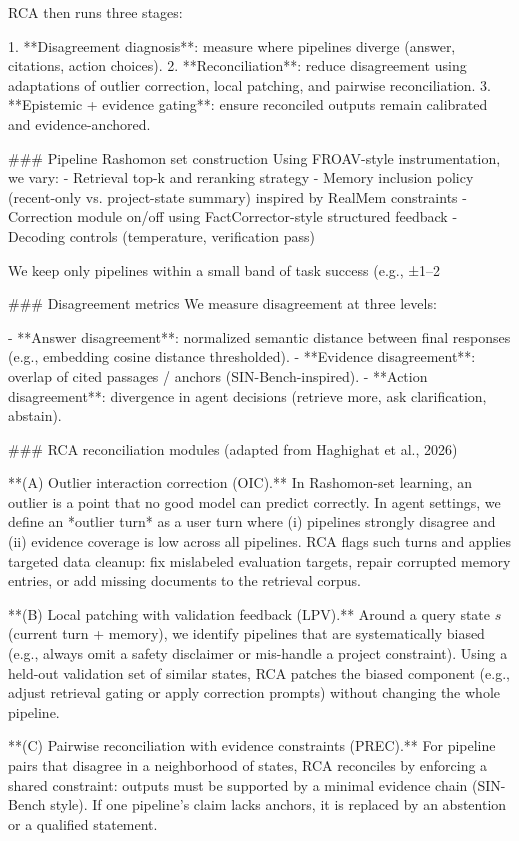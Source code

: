 RCA then runs three stages:

1. **Disagreement diagnosis**: measure where pipelines diverge (answer, citations, action choices).  
2. **Reconciliation**: reduce disagreement using adaptations of outlier correction, local patching, and pairwise reconciliation.  
3. **Epistemic + evidence gating**: ensure reconciled outputs remain calibrated and evidence-anchored.

### Pipeline Rashomon set construction  
Using FROAV-style instrumentation, we vary:
- Retrieval top-k and reranking strategy  
- Memory inclusion policy (recent-only vs. project-state summary) inspired by RealMem constraints  
- Correction module on/off using FactCorrector-style structured feedback  
- Decoding controls (temperature, verification pass)

We keep only pipelines within a small band of task success (e.g., ±1–2%

### Disagreement metrics  
We measure disagreement at three levels:

- **Answer disagreement**: normalized semantic distance between final responses (e.g., embedding cosine distance thresholded).  
- **Evidence disagreement**: overlap of cited passages / anchors (SIN-Bench-inspired).  
- **Action disagreement**: divergence in agent decisions (retrieve more, ask clarification, abstain).

### RCA reconciliation modules (adapted from Haghighat et al., 2026)

**(A) Outlier interaction correction (OIC).**  
In Rashomon-set learning, an outlier is a point that no good model can predict correctly. In agent settings, we define an *outlier turn* as a user turn where (i) pipelines strongly disagree and (ii) evidence coverage is low across all pipelines. RCA flags such turns and applies targeted data cleanup: fix mislabeled evaluation targets, repair corrupted memory entries, or add missing documents to the retrieval corpus.

**(B) Local patching with validation feedback (LPV).**  
Around a query state \(s\) (current turn + memory), we identify pipelines that are systematically biased (e.g., always omit a safety disclaimer or mis-handle a project constraint). Using a held-out validation set of similar states, RCA patches the biased component (e.g., adjust retrieval gating or apply correction prompts) without changing the whole pipeline.

**(C) Pairwise reconciliation with evidence constraints (PREC).**  
For pipeline pairs that disagree in a neighborhood of states, RCA reconciles by enforcing a shared constraint: outputs must be supported by a minimal evidence chain (SIN-Bench style). If one pipeline’s claim lacks anchors, it is replaced by an abstention or a qualified statement.

